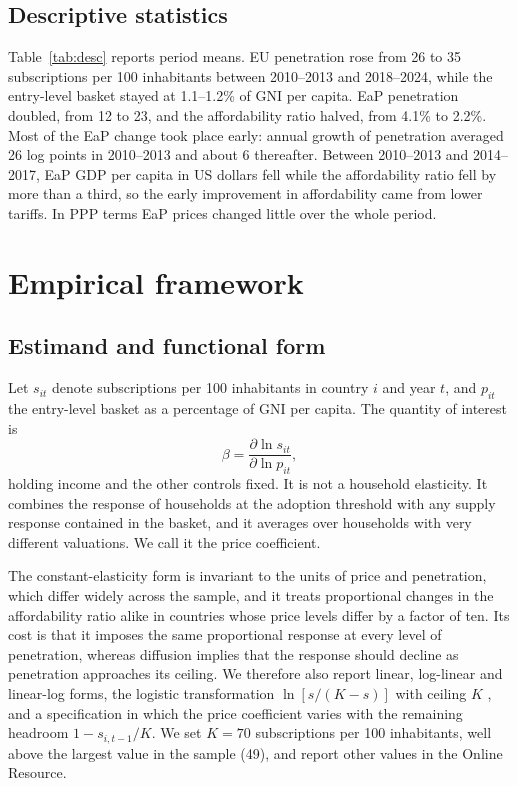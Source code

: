 \documentclass[pdflatex,sn-basic]{sn-jnl}
\begin{document}
\subsection{Descriptive statistics}

Table~\ref{tab:desc} reports period means. EU penetration rose from 26 to 35 subscriptions per 100 inhabitants between 2010--2013 and 2018--2024, while the entry-level basket stayed at 1.1--1.2\% of GNI per capita. EaP penetration doubled, from 12 to 23, and the affordability ratio halved, from 4.1\% to 2.2\%. Most of the EaP change took place early: annual growth of penetration averaged 26 log points in 2010--2013 and about 6 thereafter. Between 2010--2013 and 2014--2017, EaP GDP per capita in US dollars fell while the affordability ratio fell by more than a third, so the early improvement in affordability came from lower tariffs. In PPP terms EaP prices changed little over the whole period.




\section{Empirical framework}\label{sec:method}

\subsection{Estimand and functional form}

Let $s_{it}$ denote subscriptions per 100 inhabitants in country $i$ and year $t$, and $p_{it}$ the entry-level basket as a percentage of GNI per capita. The quantity of interest is
\begin{equation}\label{eq:estimand}
\beta = \frac{\partial \ln s_{it}}{\partial \ln p_{it}},
\end{equation}
holding income and the other controls fixed. It is not a household elasticity. It combines the response of households at the adoption threshold with any supply response contained in the basket, and it averages over households with very different valuations. We call it the price coefficient.

The constant-elasticity form is invariant to the units of price and penetration, which differ widely across the sample, and it treats proportional changes in the affordability ratio alike in countries whose price levels differ by a factor of ten. Its cost is that it imposes the same proportional response at every level of penetration, whereas diffusion implies that the response should decline as penetration approaches its ceiling. We therefore also report linear, log-linear and linear-log forms, the logistic transformation $\ln[s/(K-s)]$ with ceiling $K$ \citep[on logistic models of Internet subscription, see][]{ramirezhassan2019dynamic}, and a specification in which the price coefficient varies with the remaining headroom $1-s_{i,t-1}/K$. We set $K=70$ subscriptions per 100 inhabitants, well above the largest value in the sample (49), and report other values in the Online Resource.
\end{document}
